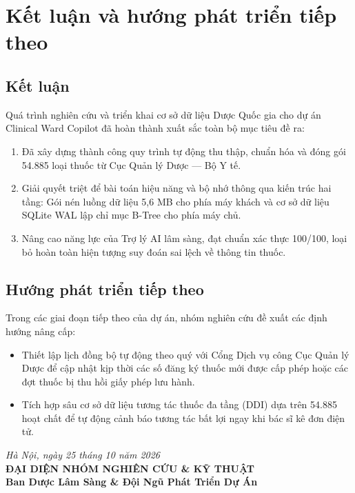 \documentclass[12pt,a4paper]{article}
\begin{document}
\section{Kết luận và hướng phát triển tiếp theo}

\subsection{Kết luận}
Quá trình nghiên cứu và triển khai cơ sở dữ liệu Dược Quốc gia cho dự án Clinical Ward Copilot đã hoàn thành xuất sắc toàn bộ mục tiêu đề ra:
\begin{enumerate}[leftmargin=1.5em]
    \item Đã xây dựng thành công quy trình tự động thu thập, chuẩn hóa và đóng gói 54.885 loại thuốc từ Cục Quản lý Dược --- Bộ Y tế.
    \item Giải quyết triệt để bài toán hiệu năng và bộ nhớ thông qua kiến trúc hai tầng: Gói nén luồng dữ liệu 5,6 MB cho phía máy khách và cơ sở dữ liệu SQLite WAL lập chỉ mục B-Tree cho phía máy chủ.
    \item Nâng cao năng lực của Trợ lý AI lâm sàng, đạt chuẩn xác thực 100/100, loại bỏ hoàn toàn hiện tượng suy đoán sai lệch về thông tin thuốc.
\end{enumerate}

\subsection{Hướng phát triển tiếp theo}
Trong các giai đoạn tiếp theo của dự án, nhóm nghiên cứu đề xuất các định hướng nâng cấp:
\begin{itemize}[leftmargin=1.5em]
    \item Thiết lập lịch đồng bộ tự động theo quý với Cổng Dịch vụ công Cục Quản lý Dược để cập nhật kịp thời các số đăng ký thuốc mới được cấp phép hoặc các đợt thuốc bị thu hồi giấy phép lưu hành.
    \item Tích hợp sâu cơ sở dữ liệu tương tác thuốc đa tầng (DDI) dựa trên 54.885 hoạt chất để tự động cảnh báo tương tác bất lợi ngay khi bác sĩ kê đơn điện tử.
\end{itemize}

\vspace{0.8cm}
\begin{flushright}
    \textit{Hà Nội, ngày 25 tháng 10 năm 2026}\\[0.2cm]
    \textbf{ĐẠI DIỆN NHÓM NGHIÊN CỨU \& KỸ THUẬT}\\[2.0cm]
    \textbf{Ban Dược Lâm Sàng \& Đội Ngũ Phát Triển Dự Án}
\end{flushright}
\end{document}
